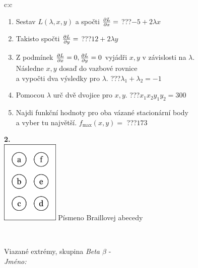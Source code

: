 \documentclass[10pt]{report}
\begin{document}
\begin{tabular}{c:c}
\begin{minipage}[c][104.5mm][t]{0.5\linewidth}
\begin{center}
\begin{minipage}{0.79\linewidth}
\begin{center}
\begin{varwidth}{\linewidth}
\begin{enumerate}
\item Sestav $L(\lambda,x,y)$ a spočti $\pdv{L}{x}=$\quad \dotfill\; ???\;\dotfill \quad $-5+2\lambda x$
\item Takisto spočti $\pdv{L}{y}=$\quad \dotfill\; ???\;\dotfill \quad $12+2\lambda y$
\item Z podmínek $\pdv{L}{x}=0 , \pdv{L}{y}=0$ vyjádři $x,y$ v závislosti na $\lambda$.\\ \phantom{xxxxxx}Následne $x,y$ dosaď do vazbové rovnice\\ \phantom{xxxxxx}a vypočti dva výsledky pro $\lambda$.\quad \dotfill\; ???\;\dotfill \quad $\lambda_1+\lambda_2=-1$
\item Pomocou $\lambda$ urč dvě dvojice pro $x,y$.\quad \dotfill\; ???\;\dotfill \quad $x_1 x_2 y_1 y_2=300$
\item Najdi funkční hodnoty pro oba vázané stacionární body\\ \phantom{xxxxxx}a vyber tu najvětší. $f_{\text{max}}(x,y)=$\quad \dotfill\; ???\;\dotfill \quad $173$
\end{enumerate}
\end{varwidth}
\end{center}
\end{minipage}
\begin{minipage}{0.20\linewidth}
\begin{center}
{\Huge\bfseries 2.} \\[2mm]
\includegraphics[height=40mm]{../images/braille.png}
{\small Písmeno Braillovej abecedy}
\end{center}
\end{minipage}
\end{center}
\end{minipage}
\\ \hdashline
\begin{minipage}[c][104.5mm][t]{0.5\linewidth}
\begin{center}
\vspace{7mm}
{\huge Viazané extrémy, skupina \textit{Beta $\beta$} -}\\[5mm]
\textit{Jméno:}\phantom{xxxxxxxxxxxxxxxxxxxxxxxxxxxxxxxxxxxxxxxxxxxxxxxxxxxxxxxxxxxxxxxxx}\\[5mm]

\end{center}
\end{minipage}
\end{tabular}
\end{document}
